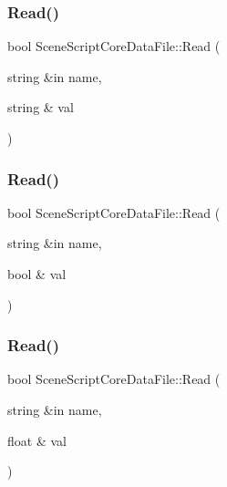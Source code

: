 \hypertarget{class_scene_script_core_data_file_a04c0d73897afa43c06f38e929f3b0e80}{}\label{class_scene_script_core_data_file_a04c0d73897afa43c06f38e929f3b0e80} 
\subsubsection{\texorpdfstring{Read()}{Read()}\hspace{0.1cm}{\footnotesize\ttfamily [1/8]}}
{\footnotesize\ttfamily bool Scene\+Script\+Core\+Data\+File\+::\+Read (\begin{DoxyParamCaption}\item[{string \&in}]{name,  }\item[{string \&}]{val }\end{DoxyParamCaption})}

\hypertarget{class_scene_script_core_data_file_a3f37a8d264ad2171202aa3155cf403ef}{}\label{class_scene_script_core_data_file_a3f37a8d264ad2171202aa3155cf403ef} 
\subsubsection{\texorpdfstring{Read()}{Read()}\hspace{0.1cm}{\footnotesize\ttfamily [2/8]}}
{\footnotesize\ttfamily bool Scene\+Script\+Core\+Data\+File\+::\+Read (\begin{DoxyParamCaption}\item[{string \&in}]{name,  }\item[{bool \&}]{val }\end{DoxyParamCaption})}

\hypertarget{class_scene_script_core_data_file_a6caf7b53cead7896f1dea14f72a16e54}{}\label{class_scene_script_core_data_file_a6caf7b53cead7896f1dea14f72a16e54} 
\subsubsection{\texorpdfstring{Read()}{Read()}\hspace{0.1cm}{\footnotesize\ttfamily [3/8]}}
{\footnotesize\ttfamily bool Scene\+Script\+Core\+Data\+File\+::\+Read (\begin{DoxyParamCaption}\item[{string \&in}]{name,  }\item[{float \&}]{val }\end{DoxyParamCaption})}


